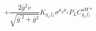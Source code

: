 %
\begin{dmath*}
%
  +  \frac{2 {\bar g}{}^2 v}{\sqrt{{\bar g}^{\prime 2} + {\bar g}{}^2}} K_{g_1 f_2} \sigma^{\mu_3 \mu_4} P_L  C^{uW*}_{g_1 f_1}
%
\end{dmath*}
%
